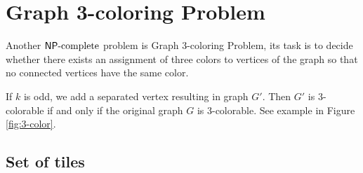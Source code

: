 \section{Graph 3-coloring Problem}



Another $\mathsf{NP}\textnormal{-complete}$ problem is Graph 3-coloring Problem, its task is to decide whether there exists an assignment of three colors to vertices of the graph so that no connected vertices have the same color.

If $k$ is odd, we add a separated vertex resulting in graph $G'$. Then $G'$ is 3-colorable if and only if the original graph $G$ is 3-colorable. See example in Figure \ref{fig:3-color}.

\subsection*{Set of tiles}

